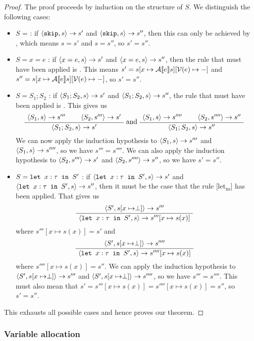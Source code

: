 \begin{proof}
The proof proceeds by induction on the structure of $S$. We distinguish the following cases:
\begin{itemize}[noitemsep]
    \item $S$ = \sk : if $\langle \texttt{skip}, s \rangle \to s'$ and $\langle \texttt{skip}, s \rangle \to s''$, then this can only be achieved by \skipns, which means $s=s'$ and $s=s''$, so $s' = s''$. 
    \item $S = x = e$ : if $\langle x = e, s \rangle \to s'$ and $\langle x = e, s \rangle \to s''$, then the rule that must have been applied is \assns. This means $s'= s[x \mapsto \mathcal{A} \llbracket e \rrbracket s][\mathcal{V}(e)\mapsto-]$ and $s''=s[x \mapsto \mathcal{A} \llbracket e \rrbracket s][\mathcal{V}(e)\mapsto-]$, so $s'=s''$.
    \item $S = S_1; S_2$ : if $\langle S_1;S_2, s \rangle \to s'$ and $\langle S_1;S_2, s \rangle \to s''$, the rule that must have been applied is \compns. This gives us
    $$ \AxiomC{$\ns{S_1}{s}{s'''}$}
\AxiomC{$\ns{S_2}{s'''}{s'}$}
\BinaryInfC{$\ns{S_1; S_2}{s}{s'}$}
\DisplayProof
 \textrm{ and }
 \AxiomC{$\ns{S_1}{s}{s''''}$}
\AxiomC{$\ns{S_2}{s''''}{s''}$}
\BinaryInfC{$\ns{S_1; S_2}{s}{s''}$}
\DisplayProof$$
    We can now apply the induction hypothesis to $\langle S_1, s \rangle \to s'''$ and $\langle S_1, s \rangle \to s''''$, so we have $s''' = s''''$. We can also apply the induction hypothesis to $\langle S_2, s''' \rangle \to s'$ and $\langle S_2, s'''' \rangle \to s''$, so we have $s' = s''$.
    \item $S = \texttt{let }x : \tau \texttt{ in } S'$ : if $\langle \texttt{let }x : \tau \texttt{ in } S', s \rangle \to s'$ and $\langle \texttt{let }x : \tau \texttt{ in } S', s \rangle \to s''$, then it must be the case that the rule [let$_{\textrm{ns}}$] has been applied. That gives us
    $$
    \AxiomC{$\ns{S'}{s[x\mapsto \perp]}{s'''}$}
\UnaryInfC{$\ns{\letm{x}{S'}}{s}{s'''[x \mapsto s(x)]}$}
\DisplayProof
    $$
    where $s'''[x \mapsto s(x)] = s'$ and
    $$\AxiomC{$\ns{S'}{s[x\mapsto \perp]}{s''''}$}
\UnaryInfC{$\ns{\letm{x}{S'}}{s}{s''''[x \mapsto s(x)]}$}
\DisplayProof
    $$
    where $s''''[x \mapsto s(x)] = s''$. 
    We can apply the induction hypothesis to $\langle S', s[x\mapsto \perp] \rangle \to s'''$ and $\langle S', s[x\mapsto \perp] \rangle \to s''''$, so we have $s''' = s''''$. This must also mean that $s' = s'''[x \mapsto s(x)] = s''''[x \mapsto s(x)] = s''$, so $s' = s''$.
\end{itemize}
This exhausts all possible cases and hence proves our theorem. 
\end{proof}

\subsubsection*{Variable allocation}

